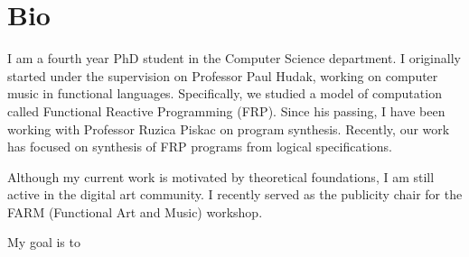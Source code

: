 \section{Bio}

I am a fourth year PhD student in the Computer Science department.
I originally started under the supervision on Professor Paul Hudak, working on computer music in functional languages.
Specifically, we studied a model of computation called Functional Reactive Programming (FRP).
Since his passing, I have been working with Professor Ruzica Piskac on program synthesis.
Recently, our work has focused on synthesis of FRP programs from logical specifications.

Although my current work is motivated by theoretical foundations, I am still active in the digital art community.
I recently served as the publicity chair for the FARM (Functional Art and Music) workshop.

My goal is to

